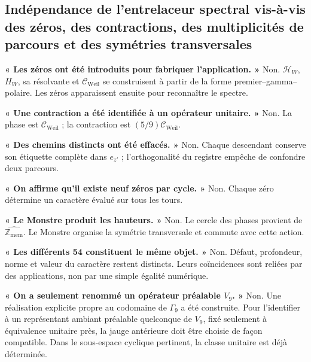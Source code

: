\subsection{Indépendance de l'entrelaceur spectral vis-à-vis des zéros, des contractions, des multiplicités de parcours et des symétries transversales}
\textbf{« Les zéros ont été introduits pour fabriquer l'application. »} Non. \(\mathcal H_W\), \(H_W\), sa résolvante et \(\mathcal C_{\mathrm{Weil}}\) se construisent à partir de la forme premier–gamma–polaire. Les zéros apparaissent ensuite pour reconnaître le spectre.\par
\textbf{« Une contraction a été identifiée à un opérateur unitaire. »} Non. La phase est \(\mathcal C_{\mathrm{Weil}}\) ; la contraction est \((5/9)\mathcal C_{\mathrm{Weil}}\).\par
\textbf{« Des chemins distincts ont été effacés. »} Non. Chaque descendant conserve son étiquette complète dans \(e_{z'}\) ; l'orthogonalité du registre empêche de confondre deux parcours.\par
\textbf{« On affirme qu'il existe neuf zéros par cycle. »} Non. Chaque zéro détermine un caractère évalué sur tous les tours.\par
\textbf{« Le Monstre produit les hauteurs. »} Non. Le cercle des phases provient de \(\widehat{\mathbb Z_{\mathrm{mem}}}\). Le Monstre organise la symétrie transversale et commute avec cette action.\par
\textbf{« Les différents 54 constituent le même objet. »} Non. Défaut, profondeur, norme et valeur du caractère restent distincts. Leurs coïncidences sont reliées par des applications, non par une simple égalité numérique.\par
\textbf{« On a seulement renommé un opérateur préalable \(V_9\). »} Non. Une réalisation explicite propre au codomaine de \(\Gamma_9\) a été construite. Pour l'identifier à un représentant ambiant préalable quelconque de \(V_9\), fixé seulement à équivalence unitaire près, la jauge antérieure doit être choisie de façon compatible. Dans le sous-espace cyclique pertinent, la classe unitaire est déjà déterminée.\par
{}
